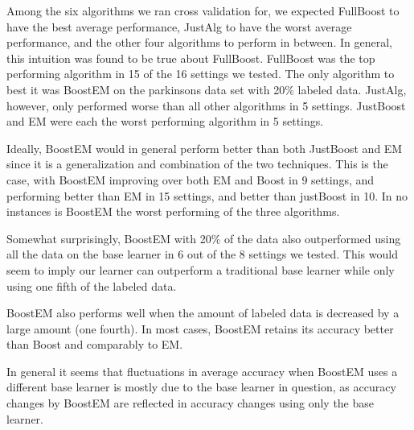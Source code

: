\documentclass{sig-alternate}
\begin{document}
 Among the six algorithms we ran cross validation for, we expected FullBoost to have the best average performance, JustAlg to
have the worst average performance, and the other four algorithms to perform in between. In general, this intuition was found to be true about FullBoost.
FullBoost was the top performing algorithm in 15 of the 16 settings we tested.
The only algorithm to best it was BoostEM on the parkinsons data set
with 20\% labeled data. JustAlg, however, only performed worse than all other algorithms in 5 settings. JustBoost and EM were each the worst performing algorithm
in 5 settings.

Ideally, BoostEM would in general perform better than both JustBoost and EM since it is a generalization and combination of the two techniques. This is the case, 
with BoostEM improving over both EM and Boost in 9 settings, and performing better than EM in 15 settings, and better than justBoost in 10. In no instances is BoostEM 
the worst performing of the three algorithms.

Somewhat surprisingly, BoostEM with 20\% of the data also outperformed using all the data on the base learner in 6 out of the 8 settings we tested.  This would seem to imply our learner can outperform a traditional base learner while only using one fifth of the labeled data.

BoostEM also performs well when the amount of labeled data is decreased by a large amount (one fourth).  In most cases, BoostEM retains its accuracy better than Boost and comparably to EM.

In general it seems that fluctuations in average accuracy when BoostEM uses a different base learner is mostly due to the base learner in question, as accuracy changes by BoostEM are reflected in accuracy changes using only the base learner.
\end{document}

